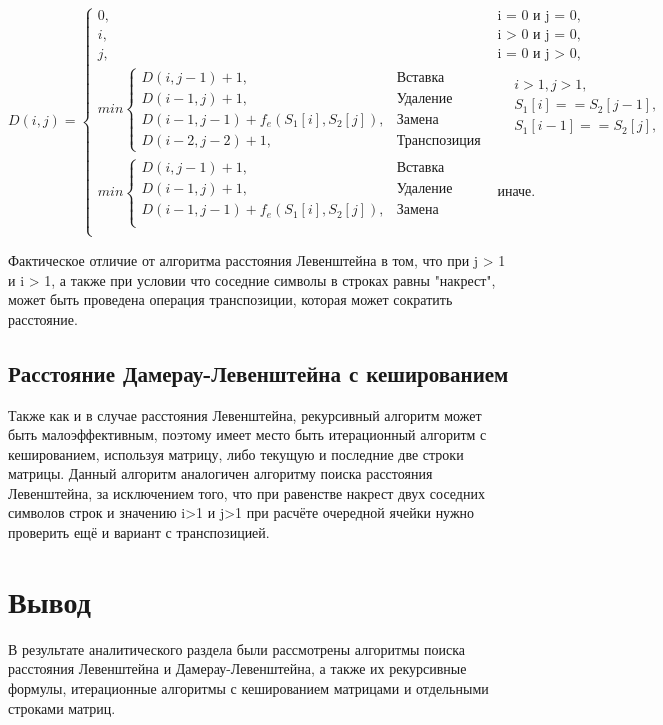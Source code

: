 \begin{equation}
	\label{eq:Dd}
	D(i, j) = 
	\begin{cases}
		0, &\text{i = 0 и j = 0},\\
		i, &\text{i > 0 и j = 0},\\
		j, &\text{i = 0 и j > 0},\\
		min \begin{cases}
			D(i, j - 1) + 1, &\text{Вставка}\\
			D(i - 1, j) + 1, &\text{Удаление}\\
			D(i - 1, j - 1) + f_e(S_1[i], S_2[j]), &\text{Замена}\\
			D(i - 2, j - 2) + 1, &\text{Транспозиция}
		\end{cases} & \begin{aligned}
		&i > 1,  j > 1, \\ 
		&S_1[i] == S_2[j - 1], \\
		&S_1[i - 1] == S_2[j],\\
		\end{aligned} \\
		min \begin{cases}
			D(i, j - 1) + 1, &\text{Вставка}\\
			D(i - 1, j) + 1, &\text{Удаление}\\
			D(i - 1, j - 1) + f_e(S_1[i], S_2[j]), &\text{Замена}\\
		\end{cases} &\text{иначе.}\\
	\end{cases}
\end{equation}

Фактическое отличие от алгоритма расстояния Левенштейна в том, что при j > 1 и i > 1, а также при условии что соседние символы в строках равны "накрест", может быть проведена операция транспозиции, которая может сократить расстояние.

\subsection{Расстояние Дамерау-Левенштейна с кешированием}
Также как и в случае расстояния Левенштейна, рекурсивный алгоритм может быть малоэффективным, поэтому имеет место быть итерационный алгоритм с кешированием, используя матрицу, либо текущую и последние две строки матрицы. Данный алгоритм аналогичен алгоритму поиска расстояния Левенштейна, за исключением того, что при равенстве накрест двух соседних символов строк и значению i>1 и j>1 при расчёте очередной ячейки нужно проверить ещё и вариант с транспозицией.


\section*{Вывод}
В результате аналитического раздела были рассмотрены алгоритмы поиска расстояния Левенштейна и Дамерау-Левенштейна, а также их рекурсивные формулы, итерационные алгоритмы с кешированием матрицами и отдельными строками матриц.

\clearpage
